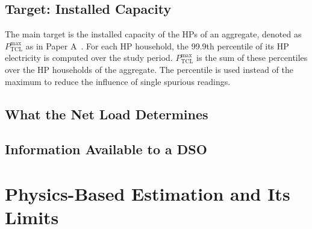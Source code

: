 \documentclass[9pt,journal,a4paper]{IEEEtran}
\begin{document}
\subsection{Target: Installed Capacity}

The main target is the installed capacity of the HPs of an aggregate, denoted as $P_{\mathrm{TCL}}^{\max}$ as in Paper A~\cite{paperA}. For each HP household, the 99.9th percentile of its HP electricity is computed over the study period. $P_{\mathrm{TCL}}^{\max}$ is the sum of these percentiles over the HP households of the aggregate. The percentile is used instead of the maximum to reduce the influence of single spurious readings.

\subsection{What the Net Load Determines}

\subsection{Information Available to a DSO}

\section{Physics-Based Estimation and Its Limits}
\label{sec:physics}
\end{document}

